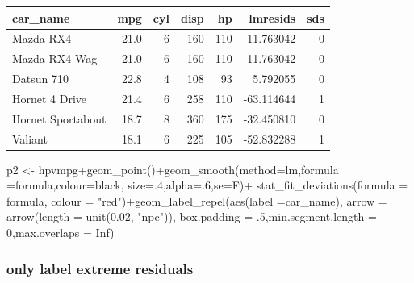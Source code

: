 \documentclass[
]{article}
\newenvironment{Shaded}{\begin{snugshade}}{\end{snugshade}}
\newcommand{\AttributeTok}[1]{\textcolor[rgb]{0.77,0.63,0.00}{#1}}
\newcommand{\ConstantTok}[1]{\textcolor[rgb]{0.00,0.00,0.00}{#1}}
\newcommand{\DecValTok}[1]{\textcolor[rgb]{0.00,0.00,0.81}{#1}}
\newcommand{\FloatTok}[1]{\textcolor[rgb]{0.00,0.00,0.81}{#1}}
\newcommand{\FunctionTok}[1]{\textcolor[rgb]{0.00,0.00,0.00}{#1}}
\newcommand{\NormalTok}[1]{#1}
\newcommand{\OtherTok}[1]{\textcolor[rgb]{0.56,0.35,0.01}{#1}}
\newcommand{\SpecialCharTok}[1]{\textcolor[rgb]{0.00,0.00,0.00}{#1}}
\newcommand{\StringTok}[1]{\textcolor[rgb]{0.31,0.60,0.02}{#1}}
\begin{document}
\begin{table}
\centering
\begin{tabular}{l|r|r|r|r|r|r}
\hline
car\_name & mpg & cyl & disp & hp & lmresids & sds\\
\hline
Mazda RX4 & 21.0 & 6 & 160 & 110 & -11.763042 & 0\\
\hline
Mazda RX4 Wag & 21.0 & 6 & 160 & 110 & -11.763042 & 0\\
\hline
Datsun 710 & 22.8 & 4 & 108 & 93 & 5.792055 & 0\\
\hline
Hornet 4 Drive & 21.4 & 6 & 258 & 110 & -63.114644 & 1\\
\hline
Hornet Sportabout & 18.7 & 8 & 360 & 175 & -32.450810 & 0\\
\hline
Valiant & 18.1 & 6 & 225 & 105 & -52.832288 & 1\\
\hline
\end{tabular}
\end{table}

\begin{Shaded}
\begin{Highlighting}[]
\NormalTok{p2 }\OtherTok{\textless{}{-}}\NormalTok{ hpvmpg}\SpecialCharTok{+}\FunctionTok{geom\_point}\NormalTok{()}\SpecialCharTok{+}\FunctionTok{geom\_smooth}\NormalTok{(}\AttributeTok{method=}\StringTok{\textquotesingle{}lm\textquotesingle{}}\NormalTok{,}\AttributeTok{formula =}\NormalTok{formula,}\AttributeTok{colour=}\StringTok{\textquotesingle{}black\textquotesingle{}}\NormalTok{, }\AttributeTok{size=}\NormalTok{.}\DecValTok{4}\NormalTok{,}\AttributeTok{alpha=}\NormalTok{.}\DecValTok{6}\NormalTok{,}\AttributeTok{se=}\NormalTok{F)}\SpecialCharTok{+}
  \FunctionTok{stat\_fit\_deviations}\NormalTok{(}\AttributeTok{formula =}\NormalTok{ formula, }\AttributeTok{colour =} \StringTok{"red"}\NormalTok{)}\SpecialCharTok{+}\FunctionTok{geom\_label\_repel}\NormalTok{(}\FunctionTok{aes}\NormalTok{(}\AttributeTok{label =}\NormalTok{car\_name),}
    \AttributeTok{arrow =} \FunctionTok{arrow}\NormalTok{(}\AttributeTok{length =} \FunctionTok{unit}\NormalTok{(}\FloatTok{0.02}\NormalTok{, }\StringTok{"npc"}\NormalTok{)),}
    \AttributeTok{box.padding =}\NormalTok{ .}\DecValTok{5}\NormalTok{,}\AttributeTok{min.segment.length =} \DecValTok{0}\NormalTok{,}\AttributeTok{max.overlaps =} \ConstantTok{Inf}\NormalTok{)}
\end{Highlighting}
\end{Shaded}

\hypertarget{only-label-extreme-residuals}{%
\subsubsection{only label extreme residuals}\label{only-label-extreme-residuals}}
\end{document}
